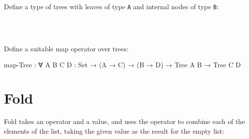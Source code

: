 Define a type of trees with leaves of type \texttt{A} and internal nodes
of type \texttt{B}:

\begin{fence}
\begin{code}%
\>[0]\AgdaSpace{}%
\AgdaSpace{}%
\AgdaSymbol{(}\AgdaSpace{}%
\AgdaSpace{}%
\AgdaSymbol{:}\AgdaSpace{}%
\AgdaSymbol{)}\AgdaSpace{}%
\AgdaSymbol{:}\AgdaSpace{}%
\AgdaSpace{}%
\<%
\\
\>[0][@{}l@{\AgdaIndent{0}}]%
\>[2]\AgdaSpace{}%
\AgdaSymbol{:}\AgdaSpace{}%
\AgdaSpace{}%
\AgdaSpace{}%
\AgdaSpace{}%
\AgdaSpace{}%
\<%
\\
%
\>[2]\AgdaSpace{}%
\AgdaSymbol{:}\AgdaSpace{}%
\AgdaSpace{}%
\AgdaSpace{}%
\AgdaSpace{}%
\AgdaSpace{}%
\AgdaSpace{}%
\AgdaSpace{}%
\AgdaSpace{}%
\AgdaSpace{}%
\AgdaSpace{}%
\AgdaSpace{}%
\AgdaSpace{}%
\AgdaSpace{}%
\<%
\end{code}
\end{fence}

Define a suitable map operator over trees:

\begin{myDisplay}
map-Tree : ∀ {A B C D : Set} → (A → C) → (B → D) → Tree A B → Tree C D
\end{myDisplay}

\begin{fence}
\begin{code}%
\>[0]\<%
\end{code}
\end{fence}

\hypertarget{Lists-Fold}{%
\section{Fold}\label{Lists-Fold}}

Fold takes an operator and a value, and uses the operator to combine
each of the elements of the list, taking the given value as the result
for the empty list:

